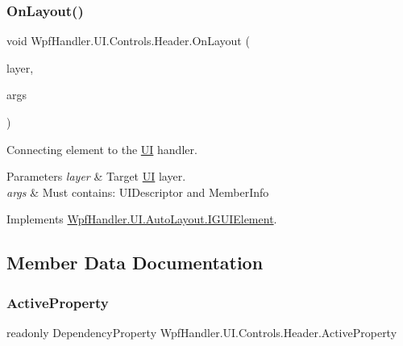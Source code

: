 \subsubsection{\texorpdfstring{On\+Layout()}{OnLayout()}}
{\footnotesize\ttfamily void Wpf\+Handler.\+U\+I.\+Controls.\+Header.\+On\+Layout (\begin{DoxyParamCaption}\item[{ref \mbox{\hyperlink{class_wpf_handler_1_1_u_i_1_1_auto_layout_1_1_layout_layer}{Layout\+Layer}}}]{layer,  }\item[{params object \mbox{[}$\,$\mbox{]}}]{args }\end{DoxyParamCaption})}



Connecting element to the \mbox{\hyperlink{namespace_wpf_handler_1_1_u_i}{UI}} handler. 


\begin{DoxyParams}{Parameters}
{\em layer} & Target \mbox{\hyperlink{namespace_wpf_handler_1_1_u_i}{UI}} layer.\\
\hline
{\em args} & Must contains\+: U\+I\+Descriptor and Member\+Info\\
\hline
\end{DoxyParams}


Implements \mbox{\hyperlink{interface_wpf_handler_1_1_u_i_1_1_auto_layout_1_1_i_g_u_i_element_a0ff16956f8e8187d51e1b36b6b9f894e}{Wpf\+Handler.\+U\+I.\+Auto\+Layout.\+I\+G\+U\+I\+Element}}.



\subsection{Member Data Documentation}
\mbox{\label{class_wpf_handler_1_1_u_i_1_1_controls_1_1_header_a8d052187be3a68e9da2d4436bea3b504}} 
\subsubsection{\texorpdfstring{Active\+Property}{ActiveProperty}}
{\footnotesize\ttfamily readonly Dependency\+Property Wpf\+Handler.\+U\+I.\+Controls.\+Header.\+Active\+Property\hspace{0.3cm}{\ttfamily [static]}}

